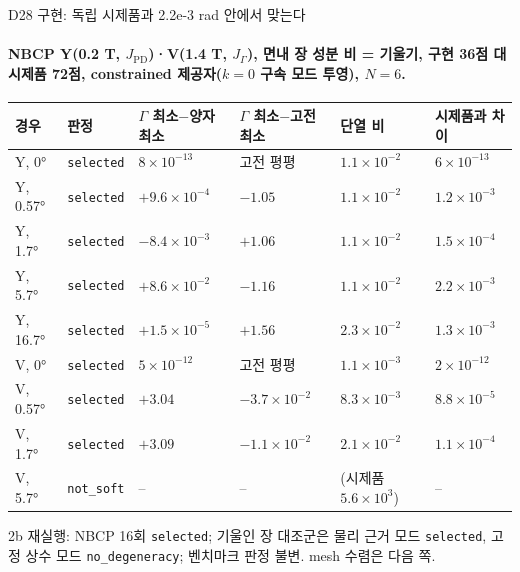 \begin{frame}[label=d28-verification]{D28 구현: 독립 시제품과 2.2e-3 rad 안에서 맞는다}
  \framesubtitle{NBCP Y(0.2 T, $J_{\mathrm{PD}}$)·V(1.4 T, $J_\Gamma$), 면내 장 성분 비 = 기울기, 구현 36점 대 시제품 72점, constrained 제공자($k=0$ 구속 모드 투영), $N=6$.}
  \footnotesize\renewcommand{\arraystretch}{1.08}
  \begin{tabularx}{\textwidth}{@{}P{1.6cm}P{1.5cm}P{2.3cm}P{2.3cm}P{1.6cm}Y@{}}
    \toprule
    경우 & 판정 & $\Gamma$ 최소$-$양자 최소 & $\Gamma$ 최소$-$고전 최소 & 단열 비 & 시제품과 차이 \\
    \midrule
    Y, 0° & \texttt{selected} & $8\times10^{-13}$ & 고전 평평 & $1.1\times10^{-2}$ & $6\times10^{-13}$ \\
    Y, 0.57° & \texttt{selected} & $+9.6\times10^{-4}$ & $-1.05$ & $1.1\times10^{-2}$ & $1.2\times10^{-3}$ \\
    Y, 1.7° & \texttt{selected} & $-8.4\times10^{-3}$ & $+1.06$ & $1.1\times10^{-2}$ & $1.5\times10^{-4}$ \\
    Y, 5.7° & \texttt{selected} & $+8.6\times10^{-2}$ & $-1.16$ & $1.1\times10^{-2}$ & $2.2\times10^{-3}$ \\
    Y, 16.7° & \texttt{selected} & $+1.5\times10^{-5}$ & $+1.56$ & $2.3\times10^{-2}$ & $1.3\times10^{-3}$ \\
    V, 0° & \texttt{selected} & $5\times10^{-12}$ & 고전 평평 & $1.1\times10^{-3}$ & $2\times10^{-12}$ \\
    V, 0.57° & \texttt{selected} & $+3.04$ & $-3.7\times10^{-2}$ & $8.3\times10^{-3}$ & $8.8\times10^{-5}$ \\
    V, 1.7° & \texttt{selected} & $+3.09$ & $-1.1\times10^{-2}$ & $2.1\times10^{-2}$ & $1.1\times10^{-4}$ \\
    V, 5.7° & \texttt{not\_soft} & -- & -- & (시제품 $5.6\times10^{3}$) & -- \\
    \bottomrule
  \end{tabularx}
  \par\smallskip
  2b 재실행: NBCP 16회 \texttt{selected}; 기울인 장 대조군은 물리 근거 모드 \texttt{selected}, 고정 상수 모드 \texttt{no\_degeneracy}; 벤치마크 판정 불변. mesh 수렴은 다음 쪽.
  \par\smallskip
\end{frame}

